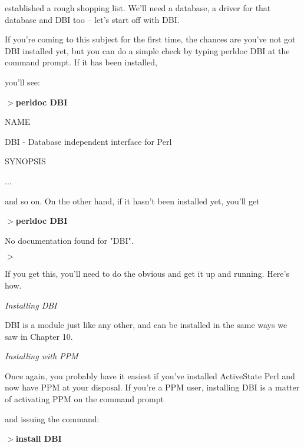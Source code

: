 \documentclass[a4paper,11pt]{book}
\begin{document}
\noindent established a  rough  shopping  list.  We'll  need  a  database,  a  driver  for  that  database  and DBI  too  -- let's start off with DBI.

\noindent 

\noindent If you're coming to this subject for the first time, the chances are you've not got DBI installed yet, but you can do a simple check by typing perldoc DBI at the command prompt. If it has been installed,

\noindent you'll see:

\noindent 

\noindent $>$\textbf{perldoc DBI}

\noindent NAME

\noindent DBI - Database independent interface for Perl

\noindent 

\noindent SYNOPSIS

\noindent ...

\noindent 

\noindent 

\noindent and so on. On the other hand, if it hasn't been installed yet, you'll get

\noindent 

\noindent $>$\textbf{perldoc DBI}

\noindent No documentation found for "DBI".

\noindent $>$

\noindent 

\noindent If you get this, you'll need to do the obvious and get it up and running. Here's how.

\noindent 

\noindent \textit{Installing DBI}

\noindent DBI is a module just like any other, and can be installed in the same ways we saw in Chapter 10.

\noindent 

\noindent \textit{Installing with PPM}

\noindent Once again, you probably have it easiest if you've installed ActiveState Perl and now have PPM at your disposal. If you're a PPM user, installing DBI is a matter of activating PPM on the command prompt

\noindent and issuing the command:

\noindent 

\noindent $>$\textbf{install DBI}

\noindent 
\end{document}
